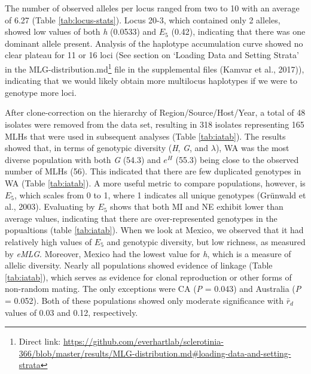 \documentclass[fleqn,10pt,lineno]{wlpeerj} %
\theoremstyle{definition}
\theoremstyle{definition}
\theoremstyle{definition}
\theoremstyle{remark}
\begin{document}
The number of observed alleles per locus ranged from two to 10 with an
average of 6.27 (Table \ref{tab:locus-stats}). Locus 20-3, which
contained only 2 alleles, showed low values of both \emph{h} (0.0533)
and \(E_5\) (0.42), indicating that there was one dominant allele
present. Analysis of the haplotype accumulation curve showed no clear
plateau for 11 or 16 loci (See section on `Loading Data and Setting
Strata' in the MLG-distribution.md\footnote{Direct link:
  \url{https://github.com/everhartlab/sclerotinia-366/blob/master/results/MLG-distribution.md\#loading-data-and-setting-strata}}
file in the supplemental files (Kamvar et al., 2017)), indicating that
we would likely obtain more multilocus haplotypes if we were to genotype
more loci.

After clone-correction on the hierarchy of Region/Source/Host/Year, a
total of 48 isolates were removed from the data set, resulting in 318
isolates representing 165 MLHs that were used in subsequent analyses
(Table \ref{tab:iatab}). The results showed that, in terms of genotypic
diversity (\emph{H}, \emph{G}, and \(\lambda\)), WA was the most diverse
population with both \emph{G} (54.3) and \(e^H\) (55.3) being close to
the observed number of MLHs (56). This indicated that there are few
duplicated genotypes in WA (Table \ref{tab:iatab}). A more useful metric
to compare populations, however, is \(E_5\), which scales from 0 to 1,
where 1 indicates all unique genotypes (Grünwald et al., 2003).
Evaluating by \(E_5\) shows that both MI and NE exhibit lower than
average values, indicating that there are over-represented genotypes in
the popualtions (table \ref{tab:iatab}). When we look at Mexico, we
observed that it had relatively high values of \(E_5\) and genotypic
diversity, but low richness, as measured by \emph{eMLG}. Moreover,
Mexico had the lowest value for \emph{h}, which is a measure of allelic
diversity. Nearly all populations showed evidence of linkage (Table
\ref{tab:iatab}), which serves as evidence for clonal reproduction or
other forms of non-random mating. The only exceptions were CA (\emph{P}
= 0.043) and Australia (\emph{P} = 0.052). Both of these populations
showed only moderate significance with \(\bar{r}_d\) values of 0.03 and
0.12, respectively.
\end{document}
